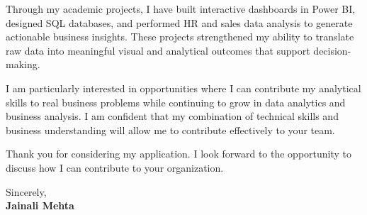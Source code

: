 \documentclass[letterpaper,11pt]{article}
\begin{document}
\bigbreak

Through my academic projects, I have built interactive dashboards in Power BI, designed SQL databases, and performed HR and sales data analysis to generate actionable business insights. These projects strengthened my ability to translate raw data into meaningful visual and analytical outcomes that support decision-making.

\bigbreak

I am particularly interested in opportunities where I can contribute my analytical skills to real business problems while continuing to grow in data analytics and business analysis. I am confident that my combination of technical skills and business understanding will allow me to contribute effectively to your team.

\bigbreak

Thank you for considering my application. I look forward to the opportunity to discuss how I can contribute to your organization.

\bigbreak

Sincerely, \\
\textbf{Jainali Mehta}
\end{document}
